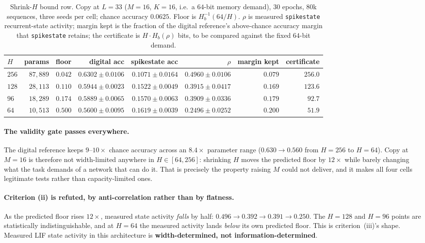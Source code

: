 \begin{table}[t]
\centering
\caption{Shrink-$H$ bound row. Copy at $L{=}33$ ($M{=}16$, $K{=}16$, i.e.\ a $64$-bit memory
demand), $30$ epochs, $80$k sequences, three seeds per cell; chance accuracy $0.0625$.
Floor is $H_b^{-1}(64/H)$. $\rho$ is measured \texttt{spikestate} recurrent-state activity;
margin kept is the fraction of the digital reference's above-chance accuracy margin that
\texttt{spikestate} retains; the certificate is $H \cdot H_b(\rho)$ bits, to be compared
against the fixed $64$-bit demand.}
\label{tab:bound}
\footnotesize
\setlength{\tabcolsep}{4pt}
\begin{tabular}{lrrrrrrr}
\toprule
$H$ & params & floor & digital acc & spikestate acc & $\rho$ & margin kept & certificate \\
\midrule
$256$ & $87{,}889$ & $0.042$ & $0.6302 \pm 0.0106$ & $0.1071 \pm 0.0164$ & $0.4960 \pm 0.0106$ & $0.079$ & $256.0$ \\
$128$ & $28{,}113$ & $0.110$ & $0.5944 \pm 0.0023$ & $0.1522 \pm 0.0049$ & $0.3915 \pm 0.0417$ & $0.169$ & $123.6$ \\
$96$  & $18{,}289$ & $0.174$ & $0.5889 \pm 0.0065$ & $0.1570 \pm 0.0063$ & $0.3909 \pm 0.0336$ & $0.179$ & $92.7$ \\
$64$  & $10{,}513$ & $0.500$ & $0.5600 \pm 0.0095$ & $0.1619 \pm 0.0039$ & $0.2496 \pm 0.0252$ & $0.200$ & $51.9$ \\
\bottomrule
\end{tabular}
\end{table}

\paragraph{The validity gate passes everywhere.}
The digital reference keeps $9$--$10\times$ chance accuracy across an $8.4\times$ parameter
range ($0.630 \to 0.560$ from $H{=}256$ to $H{=}64$). Copy at $M{=}16$ is therefore not
width-limited anywhere in $H \in [64, 256]$: shrinking $H$ moves the predicted floor by
$12\times$ while barely changing what the task demands of a network that can do it. That is
precisely the property raising $M$ could not deliver, and it makes all four cells legitimate
tests rather than capacity-limited ones.

\paragraph{Criterion (ii) is refuted, by anti-correlation rather than by flatness.}
As the predicted floor rises $12\times$, measured state activity \emph{falls} by half:
$0.496 \to 0.392 \to 0.391 \to 0.250$. The $H{=}128$ and $H{=}96$ points are statistically
indistinguishable, and at $H{=}64$ the measured activity lands \emph{below} its own predicted
floor. This is criterion~(iii)'s shape. Measured LIF state activity in this architecture is
\textbf{width-determined, not information-determined}.

